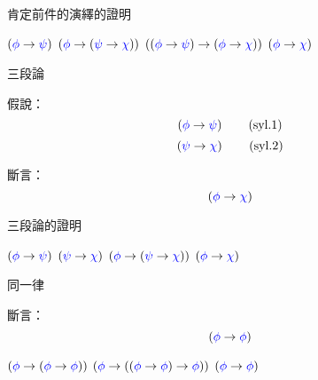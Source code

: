 \documentclass{Slideshow}
\begin{document}
\begin{frame}{肯定前件的演繹的證明}
    \begin{mmproof}
        \begin{mmtable}{2em}{3em}
                $\wi\wph\wps$
                \label{mpd:1}
                $\wi\wph{\wi\wps\wch}$
                \label{mpd:2}
                $\aIIi\wph\wps\wch$
                \label{mpd:a2i}
                $\wi\wph\wch$
        \end{mmtable}
    \end{mmproof}
\end{frame}

\begin{frame}{三段論}
    \begin{theorem}
        假說：
        \[ \wi\wph\wps \tag{syl.1} \]
        \[ \wi\wps\wch \tag{syl.2} \]

        斷言：
        \[ \wi\wph\wch \]
    \end{theorem}
\end{frame}

\begin{frame}{三段論的證明}
    \begin{mmproof}
        \begin{mmtable}{2em}{3em}
                $\wi\wph\wps$
                \label{syl:1}
                $\wi\wps\wch$
                \label{syl:2}
                $\wi\wph{\wi\wps\wch}$
                \label{syl:a1i}
                $\wi\wph\wch$
        \end{mmtable}
    \end{mmproof}
\end{frame}

\begin{frame}{同一律}
    \begin{theorem}[\mmtarget{id}]
        斷言：
        \[ \wi\wph\wph \]

        \begin{mmproof}
            \begin{mmtable}{2em}{3em}
                    $\axI\wph\wph$
                    \label{id:ax-1:1}
                    $\axI\wph{\wi\wph\wph}$
                    \label{id:ax-1:2}
                    $\wi\wph\wph$
            \end{mmtable}
        \end{mmproof}
    \end{theorem}
\end{frame}
\end{document}
